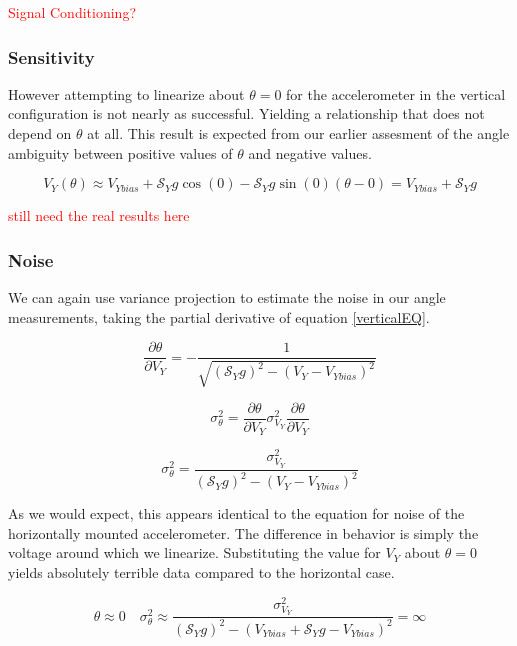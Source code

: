\documentclass{article}
\newcommand{\xxx}[1]{\textcolor{red}{#1}}
\theoremstyle{plain}
\theoremstyle{definition}
\theoremstyle{remark}
\newcommand{\Sens}{\mathcal{S}}
\begin{document}
\xxx{Signal Conditioning?}

\subsubsection{Sensitivity}

However attempting to linearize about $\theta = 0$ for the accelerometer in the vertical configuration is not nearly as successful.  Yielding a relationship that does not depend on $\theta$ at all.  This result is expected from our earlier assesment of the angle ambiguity between positive values of $\theta$ and negative values.  

$$V_{Y}(\theta) \approx V_{Ybias} + \Sens_{Y} g \cos(0) - \Sens_{Y} g \sin(0) (\theta - 0) = V_{Ybias} + \Sens_{Y} g $$

\xxx{still need the real results here}

\subsubsection{Noise}

We can again use variance projection to estimate the noise in our angle measurements, taking the partial derivative of equation \ref{verticalEQ}.

$$ \frac{\partial \theta}{\partial V_{Y}} = -\frac{1}{\sqrt{(\Sens_{Y} g)^2 - (V_{Y} - V_{Ybias})^2}}$$

$$ \sigma^2_{\theta} = \frac{\partial \theta}{\partial V_{Y}} \sigma^2_{V_{Y}} \frac{\partial \theta}{\partial V_{Y}} $$

$$ \sigma^2_{\theta} = \frac{\sigma^2_{V_{Y}}}{(\Sens_{Y} g)^2 - (V_{Y} - V_{Ybias})^2}$$

As we would expect, this appears identical to the equation for noise of the horizontally mounted accelerometer.  The difference in behavior is simply the voltage around which we linearize.  Substituting the value for $V_{Y}$ about $\theta = 0$  yields absolutely terrible data compared to the horizontal case.


$$ \theta \approx 0 \quad \sigma^2_{\theta} \approx \frac{\sigma^2_{V_{Y}}}{(\Sens_{Y} g)^2 - (V_{Ybias} + \Sens_{Y} g - V_{Ybias})^2} = \infty$$

\end{document}
